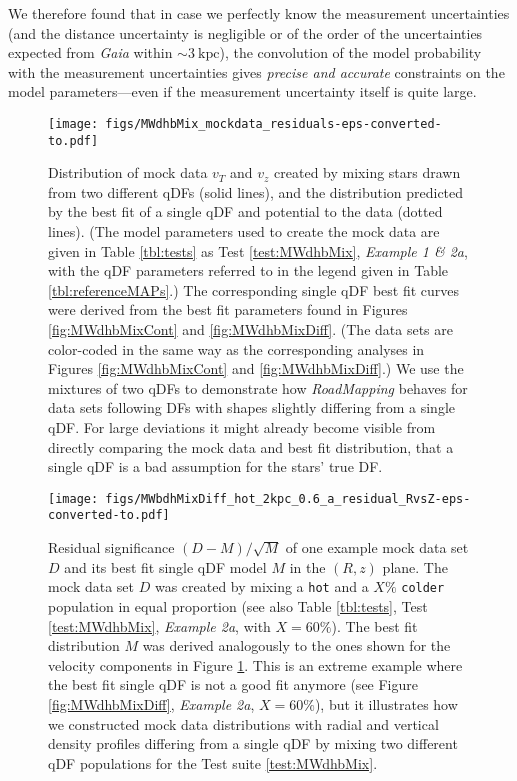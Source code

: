 \documentclass[iop,revtex4,numberedappendix,appendixfloats]{emulateapj}
\newcommand{\RM}{{\sl RoadMapping}}
\begin{document}
We therefore found that in case we perfectly know the measurement uncertainties (and the distance uncertainty is negligible or of the order of the uncertainties expected from \emph{Gaia} within $\sim3~\text{kpc}$), the convolution of the model probability with the measurement uncertainties gives \emph{precise and accurate} constraints on the model parameters---even if the measurement uncertainty itself is quite large.

\begin{figure}[!htbp]
\centering
\texttt{[image: figs/MWdhbMix\_mockdata\_residuals-eps-converted-to.pdf]}
\caption{Distribution of mock data $v_T$ and $v_z$ created by mixing stars drawn from two different qDFs (solid lines), and the distribution predicted by the best fit of a single qDF and potential to the data (dotted lines). (The model parameters used to create the mock data are given in Table \ref{tbl:tests} as Test \ref{test:MWdhbMix}, \emph{Example 1 \& 2a}, with the qDF parameters referred to in the legend given in Table \ref{tbl:referenceMAPs}.) The corresponding single qDF best fit curves were derived from the best fit parameters found in Figures \ref{fig:MWdhbMixCont} and \ref{fig:MWdhbMixDiff}. (The data sets are color-coded in the same way as the corresponding analyses in Figures \ref{fig:MWdhbMixCont} and \ref{fig:MWdhbMixDiff}.) We use the mixtures of two qDFs to demonstrate how \RM{} behaves for data sets following DFs with shapes slightly differing from a single qDF. For large deviations it might already become visible from directly comparing the mock data and best fit distribution, that a single qDF is a bad assumption for the stars' true DF.}
\label{fig:MWdhbMix_mockdata_residuals}
\end{figure}

\begin{figure}[!htbp]
\centering
\texttt{[image: figs/MWbdhMixDiff\_hot\_2kpc\_0.6\_a\_residual\_RvsZ-eps-converted-to.pdf]}
\caption{Residual significance $(D-M)/\sqrt{M}$ of one example mock data set $D$ and its best fit single qDF model $M$ in the $(R,z)$ plane. The mock data set $D$ was created by mixing a \texttt{hot} and a $X\%$ \texttt{colder} population in equal proportion (see also Table \ref{tbl:tests}, Test \ref{test:MWdhbMix}, \emph{Example 2a}, with $X=60\%$). The best fit distribution $M$ was derived analogously to the ones shown for the velocity components in Figure \ref{fig:MWdhbMix_mockdata_residuals}. This is an extreme example where the best fit single qDF is not a good fit anymore (see Figure \ref{fig:MWdhbMixDiff}, \emph{Example 2a}, $X=60\%$), but it illustrates how we constructed mock data distributions with radial and vertical density profiles differing from a single qDF by mixing two different qDF populations for the Test suite \ref{test:MWdhbMix}.}
\label{fig:MWbdhMix_residual_RvsZ}
\end{figure}
\end{document}

